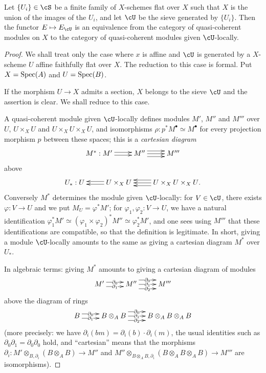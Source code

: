 \begin{theorem}\label{I:1-4-5}
Let $\{U_i\}\in\cS$ be a finite family of $X$-schemes flat over $X$ such that
$X$ is the union of the images of the $U_i$, and let $\cU$ be the sieve generated by
$\{U_i\}$. Then the functor $E\mapsto E_\cU$ is an equivalence from the
category of quasi-coherent modules on $X$ to the category of quasi-coherent
modules given $\cU$-locally.
\end{theorem}
\begin{proof}
We shall treat only the case where $x$ is affine and $\cU$ is generated by
a $X$-scheme $U$ affine faithfully flat over $X$. The reduction to this case is
formal. Put $X=\operatorname{Spec}(A)$ and $U=\operatorname{Spec}(B)$.

If the morphism $U\to X$ admits a section, $X$ belongs to the sieve $\cU$ and
the assertion is clear. We shall reduce to this case.

A quasi-coherent module given $\cU$-locally defines modules $M'$, $M''$
and $M'''$ over $U$, $U\times_X U$ and $U\times_X U\times_X U$, and
isomorphisms $\rho:p^* M^\bullet\simeq M^\bullet$ for every
projection morphism $p$ between these spaces; this is a \emph{cartesian diagram} 
\[\xymatrix{
  M^* : M' \ar@<2pt>[r] \ar@<-2pt>[r] 
    & M'' \ar[r] \ar@<4pt>[r] \ar@<-4pt>[r] 
    & M'''
}\]
above
\[\xymatrix{
  U_* : U 
    & U\times_X U \ar@<2pt>[l] \ar@<-2pt>[l] 
    & U\times_X U\times_X U \ar[l] \ar@<4pt>[l] \ar@<-4pt>[l] \mbox{.}
}\]
Conversely $M^*$ determines the module given $\cU$-locally: for
$V\in\cU$, there exists $\varphi:V\to U$ and we put $M_U=\varphi^* M'$;
for $\varphi_1,\varphi_2:V\to U$, we have a natural identification
$\varphi_1^* M'\simeq (\varphi_1\times \varphi_2)^* M'' \simeq \varphi_2^* M'$,
and one sees using $M'''$ that these identifications are compatible, so
that the definition is legitimate. In short, giving a
module $\cU$-locally amounts to the same as giving a cartesian diagram $M^*$ over $U_*$.

In algebraic terms: giving $M^*$ amounts to giving a cartesian
diagram of modules 
\[\xymatrix{
  M' \ar@<3pt>[r]|-{\partial_0} \ar@<-3pt>[r]|-{\partial_1} 
    & M'' \ar@<6pt>[r]|-{\partial_0} \ar[r]|-{\partial_1} \ar@<-6pt>[r]|-{\partial_2}
    & M'''
}\]
above the diagram of rings 
\[\xymatrix{
  B \ar@<3pt>[r]|-{\partial_0} \ar@<-3pt>[r]|-{\partial_1} 
    & B\otimes_A B \ar@<6pt>[r]|-{\partial_0} \ar[r]|-{\partial_1} \ar@<-6pt>[r]|-{\partial_2} 
    & B\otimes_A B\otimes_A B
}\]
(more precisely: we have $\partial_i(b m)=\partial_i(b)\cdot\partial_i(m)$, the
usual identities such as $\partial_0\partial_1=\partial_0\partial_0$
hold, and ``cartesian'' means that the morphisms
$\partial_i:M'\otimes_{B,\partial_i}(B\otimes_A B)\to M''$ and
$M''\otimes_{B\otimes_A B,\partial_i}(B\otimes_A B\otimes_A B)\to M'''$ are
isomorphisms).


\end{proof}
